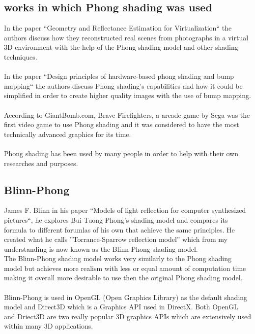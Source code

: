 \documentclass{scrartcl}
\begin{document}
\subsection{works in which Phong shading was used}
In the paper ``Geometry and Reflectance Estimation for Virtualization`` the authors discuss how they reconstructed real scenes from photographs in a virtual 3D environment with the help of the Phong shading model and other shading techniques.\cite{three}
\\~\\
In the paper ``Design principles of hardware-based phong shading and bump mapping`` the authors discuss Phong shading's capabilities and how it could be simplified in order to create higher quality images with the use of bump mapping.\cite{four}
\\~\\
According to GiantBomb.com, Brave Firefighters, a arcade game by Sega was the first video game to use Phong shading and it was considered to have the most technically advanced graphics for its time.\cite{five}
\\~\\
Phong shading has been used by many people in order to help with their own researches and purposes.

\subsection{Blinn-Phong}
James F. Blinn in his paper ``Models of light reflection for computer synthesized pictures``, he explores Bui Tuong Phong's shading model and compares its formula to different forumlas of his own that achieve the same principles. He created what he calls ''Torrance-Sparrow reflection model'' which from my understanding is now known as the Blinn-Phong shading model.\\
The Blinn-Phong shading model works very similarly to the Phong shading model but achieves more realism with less or equal amount of computation time making it overall more desirable to use then the original Phong shading model.\cite{two}
\\~\\
Blinn-Phong is used in OpenGL (Open Graphics Library) as the default shading model and Direct3D which is a Graphics API used in DirectX. Both OpenGL and Driect3D are two really popular 3D graphics APIs which are extensively used within many 3D applications.
\end{document}
